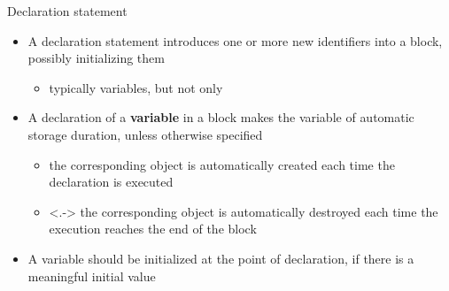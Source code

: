\begin{frame}{Declaration statement}

  \begin{itemize}[<+->]
  \item A declaration statement introduces one or more new identifiers into a
    block, possibly initializing them
    \begin{itemize}
    \item typically variables, but not only
    \end{itemize}

  \item A declaration of a \textbf{variable} in a block makes the variable of
    \alert{automatic storage duration}, unless otherwise specified
    \begin{itemize}
    \item the corresponding object is automatically created each time the
      declaration is executed
    \item<.-> the corresponding object is automatically destroyed each time the
      execution reaches the end of the block
    \end{itemize}

  \item A variable should be initialized at the point of declaration, if there
    is a meaningful initial value

  \end{itemize}

\end{frame}

